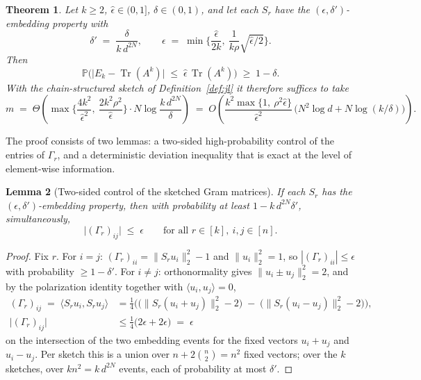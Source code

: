 \documentclass{article}
\newtheorem{theorem}{Theorem}
\newtheorem{lemma}[theorem]{Lemma}
\theoremstyle{remark}
\begin{document}
\begin{theorem}\label{thm:tracek}
Let $k \ge 2$, $\hat\epsilon \in (0,1]$, $\delta \in (0,1)$, and let each $S_r$ have the $(\epsilon,\delta')$-embedding property with
\begin{equation}\label{eq:eps-choice}
\delta' \;=\; \frac{\delta}{k\, d^{2N}},
\qquad
\epsilon \;=\; \min\Big\{ \frac{\hat\epsilon}{2k},\ \frac{1}{k\rho}\sqrt{\hat\epsilon/2} \Big\}.
\end{equation}
Then
\begin{equation}\label{eq:thm-conclusion}
\mathbb{P}\Big( \big| E_k - \operatorname{Tr}(A^k) \big| \;\le\; \hat\epsilon\, \operatorname{Tr}(A^k) \Big) \;\ge\; 1-\delta .
\end{equation}
With the chain-structured sketch of Definition~\ref{def:jl} it therefore suffices to take
\begin{equation}\label{eq:m-final}
m \;=\; \Theta\!\left( \max\Big\{ \frac{4k^2}{\hat\epsilon^{2}},\ \frac{2k^2\rho^2}{\hat\epsilon} \Big\} \cdot N\log\frac{k\,d^{2N}}{\delta} \right)
\;=\; O\!\left( \frac{k^2 \max\{1,\ \rho^2 \hat\epsilon\}}{\hat\epsilon^{2}}\,\big( N^2 \log d + N \log(k/\delta) \big) \right).
\end{equation}
\end{theorem}

The proof consists of two lemmas: a two-sided high-probability control of the entries of $\Gamma_r$, and a deterministic deviation inequality that is exact at the level of element-wise information.

\begin{lemma}[Two-sided control of the sketched Gram matrices]\label{lem:gram}
If each $S_r$ has the $(\epsilon,\delta')$-embedding property, then with probability at least $1 - k\, d^{2N} \delta'$, simultaneously,
\begin{equation}\label{eq:gram-event}
\big| (\Gamma_r)_{ij} \big| \;\le\; \epsilon
\qquad \text{for all } r \in [k],\ i,j \in [n].
\end{equation}
\end{lemma}

\begin{proof}
Fix $r$. For $i=j$: $(\Gamma_r)_{ii} = \|S_r u_i\|_2^2 - 1$ and $\|u_i\|_2^2 = 1$, so $|(\Gamma_r)_{ii}| \le \epsilon$ with probability $\ge 1-\delta'$. For $i \neq j$: orthonormality gives $\|u_i \pm u_j\|_2^2 = 2$, and by the polarization identity together with $\langle u_i,u_j\rangle = 0$,
\begin{align}
(\Gamma_r)_{ij} \;=\; \langle S_r u_i, S_r u_j \rangle
&= \tfrac14\Big( \big(\|S_r(u_i+u_j)\|_2^2 - 2\big) \;-\; \big(\|S_r(u_i-u_j)\|_2^2 - 2\big) \Big), \\
\big|(\Gamma_r)_{ij}\big| &\le \tfrac14\big( 2\epsilon + 2\epsilon \big) \;=\; \epsilon
\end{align}
on the intersection of the two embedding events for the fixed vectors $u_i + u_j$ and $u_i - u_j$. Per sketch this is a union over $n + 2\binom{n}{2} = n^2$ fixed vectors; over the $k$ sketches, over $k n^2 = k\, d^{2N}$ events, each of probability at most $\delta'$.
\end{proof}
\end{document}
